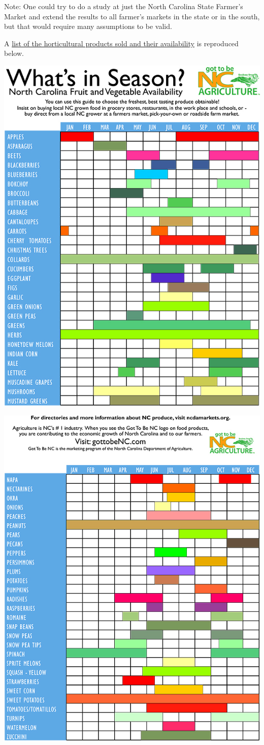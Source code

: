 \documentclass[
]{book}
\theoremstyle{definition}
\theoremstyle{definition}
\theoremstyle{definition}
\theoremstyle{remark}
\begin{document}
Note: One could try to do a study at just the North Carolina State Farmer's Market and extend the results to all farmer's markets in the state or in the south, but that would require many assumptions to be valid.

A \href{http://www.ncagr.gov/markets/chart.htm}{list of the horticultural products sold and their availability} is reproduced below.

\begin{center}\includegraphics[width=0.65\linewidth]{img/availabilitychart-1} \end{center}

\begin{center}\includegraphics[width=0.65\linewidth]{img/availabilitychart-2} \end{center}
\end{document}
